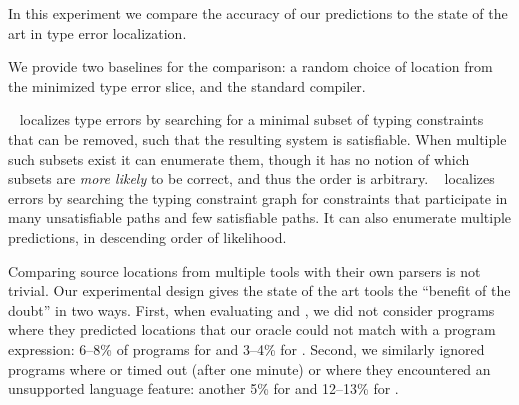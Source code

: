 \label{sec:quantitative}

In this experiment we compare the accuracy of our predictions to the
state of the art in type error localization.

We provide two baselines for the comparison: a random choice of location
from the minimized type error slice, and the standard \ocaml compiler.

\mycroft~\citep{Loncaric2016-uk} localizes type errors by searching for
a minimal subset of typing constraints that can be removed, such that
the resulting system is satisfiable.
%
When multiple such subsets exist it can enumerate them, though it has no
notion of which subsets are \emph{more likely} to be correct, and thus
the order is arbitrary.
%
\sherrloc~\citep{Zhang2014-lv} localizes errors by searching the typing
constraint graph for constraints that participate in many unsatisfiable
paths and few satisfiable paths.
%
It can also enumerate multiple predictions, in descending order of
likelihood.

Comparing source locations from multiple tools with their own parsers is
not trivial.
%
Our experimental design gives the state of the art tools the ``benefit
of the doubt'' in two ways.
First, when evaluating \mycroft and \sherrloc, we did not consider
programs where they predicted locations that our oracle could not match
with a program expression: 6--8\% of programs for \mycroft and 3--4\%
for \sherrloc.
%
Second, we similarly ignored programs where \mycroft or \sherrloc timed
out (after one minute) or where they encountered an unsupported language
feature: another 5\% for \mycroft and 12--13\% for \sherrloc.
%



